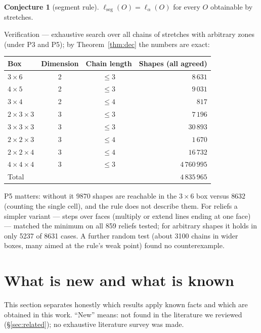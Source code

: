 \documentclass[11pt,a4paper]{article}
\theoremstyle{plain}
\theoremstyle{definition}
\newtheorem{conjecture}{Conjecture}
\theoremstyle{remark}
\newcommand{\lseg}{\ell_{\mathrm{seg}}}
\begin{document}
\begin{conjecture}[segment rule]\label{conj:seg}
$\lseg(O)=\ell_\alpha(O)$ for every $O$ obtainable by stretches.
\end{conjecture}

Verification — exhaustive search over all chains of stretches with arbitrary zones (under P3 and P5); by Theorem~\ref{thm:dec} the numbers are exact:

\begin{center}
\begin{tabular}{lccr}
\toprule
Box & Dimension & Chain length & Shapes (all agreed)\\
\midrule
$3\times6$ & 2 & $\le3$ & $8\,631$\\
$4\times5$ & 2 & $\le3$ & $9\,031$\\
$3\times4$ & 2 & $\le4$ & $817$\\
$2\times3\times3$ & 3 & $\le3$ & $7\,196$\\
$3\times3\times3$ & 3 & $\le3$ & $30\,893$\\
$2\times2\times3$ & 3 & $\le4$ & $1\,670$\\
$2\times2\times4$ & 3 & $\le4$ & $16\,732$\\
$4\times4\times4$ & 3 & $\le3$ & $4\,760\,995$\\
\midrule
Total & & & $4\,835\,965$\\
\bottomrule
\end{tabular}
\end{center}

P5 matters: without it $9870$ shapes are reachable in the $3\times6$ box versus $8632$ (counting the single cell), and the rule does not describe them. For reliefs a simpler variant — steps over faces (multiply or extend lines ending at one face) — matched the minimum on all 859 reliefs tested; for arbitrary shapes it holds in only 5237 of 8631 cases. A further random test (about 3100 chains in wider boxes, many aimed at the rule's weak point) found no counterexample.

\section{What is new and what is known}\label{sec:new}

This section separates honestly which results apply known facts and which are obtained in this work. ``New'' means: not found in the literature we reviewed (§\ref{sec:related}); no exhaustive literature survey was made.
\end{document}
